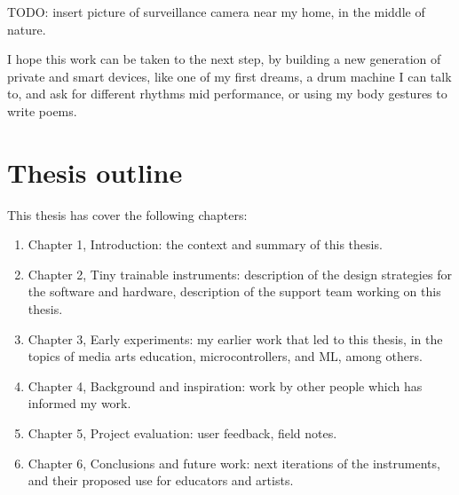 TODO: insert picture of surveillance camera near my home, in the middle of nature.

I hope this work can be taken to the next step, by building a new generation of private and smart devices, like one of my first dreams, a drum machine I can talk to, and ask for different rhythms mid performance, or using my body gestures to write poems.

\section{Thesis outline}

This thesis has cover the following chapters:

\begin{enumerate}
  \item Chapter 1, Introduction: the context and summary of this thesis.
  \item Chapter 2, Tiny trainable instruments: description of the design strategies for the software and hardware, description of the support team working on this thesis.
  \item Chapter 3, Early experiments: my earlier work that led to this thesis, in the topics of media arts education, microcontrollers, and \acrshort{ML}, among others.
  \item Chapter 4, Background and inspiration: work by other people which has informed my work.
  \item Chapter 5, Project evaluation: user feedback, field notes.
  \item Chapter 6, Conclusions and future work: next iterations of the instruments, and their proposed use for educators and artists.
  \end{enumerate}
